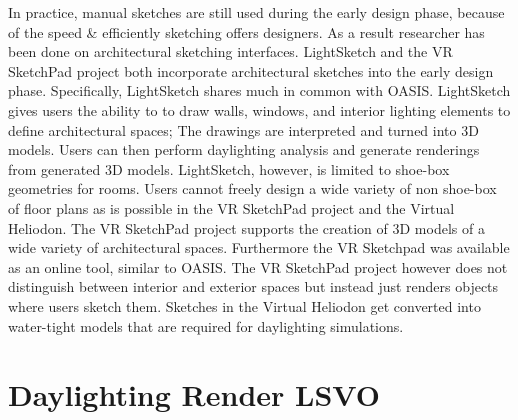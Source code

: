 	In practice, manual sketches are still used during the early design phase, because of the speed \& efficiently sketching offers designers\cite{Galasiu}.
	As a result researcher has been done on architectural sketching interfaces.
	LightSketch and the VR SketchPad project both incorporate architectural sketches into the early design phase\cite{do2001vr,glaser2003sketch}.
	Specifically, LightSketch shares much in common with OASIS.
	LightSketch gives users the ability to to draw walls, windows, and interior lighting elements to define architectural spaces\cite{glaser2003sketch}; The drawings are interpreted and turned into 3D models.
	Users can then perform daylighting analysis and generate renderings from generated 3D models.
	LightSketch, however, is limited to shoe-box geometries for rooms.
	Users cannot freely design a wide variety of non shoe-box of floor plans as is possible in the VR SketchPad project and the Virtual Heliodon.
	The VR SketchPad project supports the creation of 3D models of a wide variety of architectural spaces\cite{do2001vr}.
	Furthermore the VR Sketchpad was available as an online tool, similar to OASIS.
	The VR SketchPad project however does not distinguish between interior and exterior spaces but instead just renders objects where users sketch them.
	Sketches in the Virtual Heliodon get converted into water-tight models that are required for daylighting simulations.\\

\section{Daylighting Render LSVO}


